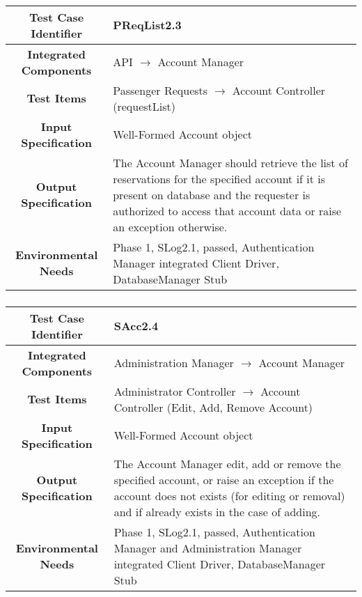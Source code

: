 \documentclass[11pt, a4paper,titlepage]{article}
\begin{document}
		 \subsubsection{}
		 \begin{tabularx}{\textwidth}{| c|X|}
		 	\hline \textbf{Test Case Identifier} & \label{PReqList2.3}PReqList2.3 \\
		 	\hline \textbf{Integrated Components} & API $\rightarrow $ Account Manager \\
		 	\hline \textbf{Test Items} &  Passenger Requests  $\rightarrow $ Account Controller (requestList)\\
		 	\hline \textbf{Input Specification} &  Well-Formed Account object\\
		 	\hline \textbf{Output Specification} & The Account Manager should retrieve the list of reservations for the specified account if it is present on database and the requester is authorized to access that account data or raise an exception otherwise.\\
		 	\hline \textbf{Environmental Needs} &  Phase 1, SLog2.1, passed, \newline Authentication Manager integrated \newline 
		 	Client Driver, DatabaseManager Stub\\
		 	\hline
		 \end{tabularx}
		 \newline
		
		 \subsubsection{}
 		 \begin{tabularx}{\textwidth}{| c|X|}
	 		 	\hline \textbf{Test Case Identifier} & \label{SAcc2.4}SAcc2.4 \\
	 		 	\hline \textbf{Integrated Components} &  Administration Manager $\rightarrow $ Account Manager \\
	 		 	\hline \textbf{Test Items} &  Administrator Controller  $\rightarrow $ Account Controller (Edit, Add, Remove Account)\\
	 		 	\hline \textbf{Input Specification} &  Well-Formed Account object\\
	 		 	\hline \textbf{Output Specification} & The Account Manager edit, add or remove the specified account, or raise an exception if the account does not exists (for editing or removal) and if already exists in the case of adding.\\
	 		 	\hline \textbf{Environmental Needs} & Phase 1, SLog2.1, passed, \newline Authentication Manager and Administration Manager integrated \newline 
	 		 	Client Driver, DatabaseManager Stub\\
	 		 	\hline
 		 \end{tabularx}
 		 \newline
		 
\end{document}
